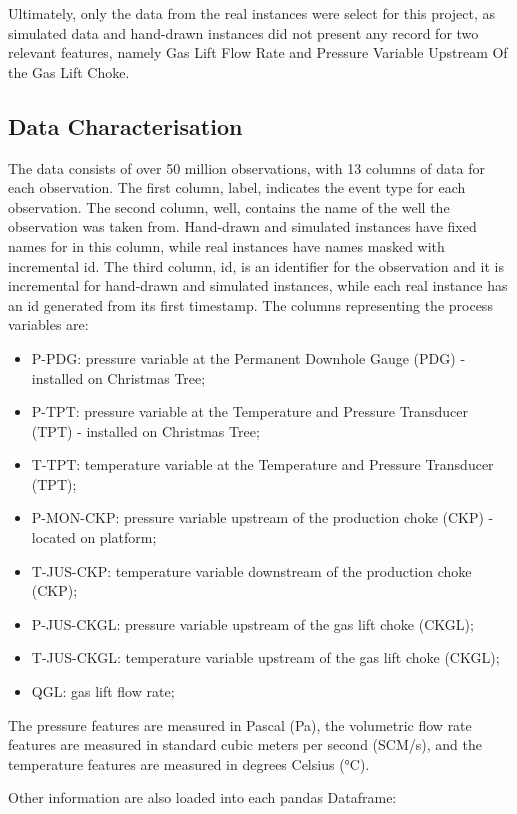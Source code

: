 \documentclass{article}
\begin{document}
Ultimately, only the data from the real instances were select for this project, as simulated data and hand-drawn instances did not present any record for two relevant features, namely Gas Lift Flow Rate and Pressure Variable Upstream Of the Gas Lift Choke.

\subsection{Data Characterisation}

The data consists of over 50 million observations, with 13 columns of data for each observation. The first column, label, indicates the event type for each observation. The second column, well, contains the name of the well the observation was taken from. Hand-drawn and simulated instances have fixed names for in this column, while real instances have names masked with incremental id. The third column, id, is an identifier for the observation and it is incremental for hand-drawn and simulated instances, while each real instance has an id generated from its first timestamp. The columns representing the process variables are:

\begin{itemize}
\item P-PDG: pressure variable at the Permanent Downhole Gauge (PDG) - installed on Christmas Tree;
\item P-TPT: pressure variable at the Temperature and Pressure Transducer (TPT) - installed on Christmas Tree;
\item T-TPT: temperature variable at the Temperature and Pressure Transducer (TPT);
\item P-MON-CKP: pressure variable upstream of the production choke (CKP) - located on platform;
\item T-JUS-CKP: temperature variable downstream of the production choke (CKP);
\item P-JUS-CKGL: pressure variable upstream of the gas lift choke (CKGL);
\item T-JUS-CKGL: temperature variable upstream of the gas lift choke (CKGL);
\item QGL: gas lift flow rate;
\end{itemize}

The pressure features are measured in Pascal (Pa), the volumetric flow rate features are measured in standard cubic meters per second (SCM/s), and the temperature features are measured in degrees Celsius (°C).

Other information are also loaded into each pandas Dataframe:
\end{document}
